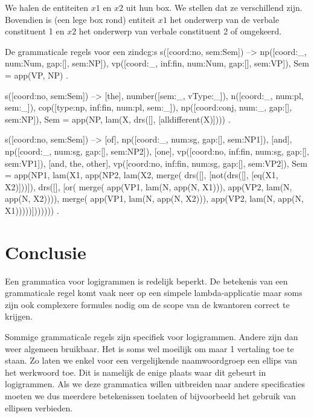 We halen de entiteiten $x1$ en $x2$ uit hun box. We stellen dat ze verschillend zijn. Bovendien is (een lege box rond) entiteit $x1$ het onderwerp van de verbale constituent 1 en $x2$ het onderwerp van verbale constituent 2 of omgekeerd.

\begin{dcg}{De grammaticale regels voor een zin}{dcg:s}
s([coord:no, sem:Sem]) -->
  np([coord:_, num:Num, gap:[], sem:NP]),
  vp([coord:_, inf:fin, num:Num, gap:[], sem:VP]),
  { Sem = app(VP, NP) }.

s([coord:no, sem:Sem]) -->
  [the],
  number([sem:_, vType:_]),
  n([coord:_, num:pl, sem:_]),
  cop([type:np, inf:fin, num:pl, sem:_]),
  np([coord:conj, num:_, gap:[], sem:NP]),
  { Sem = app(NP, lam(X, drs([], [alldifferent(X)]))) }.

s([coord:no, sem:Sem]) -->
  [of],
  np([coord:_, num:sg, gap:[], sem:NP1]),
  [and],
  np([coord:_, num:sg, gap:[], sem:NP2]),
  [one],
  vp([coord:no, inf:fin, num:sg, gap:[], sem:VP1]),
  [and, the, other],
  vp([coord:no, inf:fin, num:sg, gap:[], sem:VP2]),
  { Sem = app(NP1, lam(X1, app(NP2, lam(X2, 
      merge(
        drs([], [not(drs([], [eq(X1, X2)]))]),
        drs([], [or(
          merge(
            app(VP1, lam(N, app(N, X1))), 
            app(VP2, lam(N, app(N, X2)))), 
          merge(
            app(VP1, lam(N, app(N, X2))),
            app(VP2, lam(N, app(N, X1)))))])))))) }.
\end{dcg}

\section{Conclusie}
Een grammatica voor logigrammen is redelijk beperkt. De betekenis van een grammaticale regel komt vaak neer op een simpele lambda-applicatie maar soms zijn ook complexere formules nodig om de scope van de kwantoren correct te krijgen.

Sommige grammaticale regels zijn specifiek voor logigrammen. Andere zijn dan weer algemeen bruikbaar. Het is soms wel moeilijk om maar 1 vertaling toe te staan. Zo laten we enkel voor een vergelijkende naamwoordgroep een ellips van het werkwoord toe. Dit is namelijk de enige plaats waar dit gebeurt in logigrammen. Als we deze grammatica willen uitbreiden naar andere specificaties moeten we dus meerdere betekenissen toelaten of bijvoorbeeld het gebruik van ellipsen verbieden.
